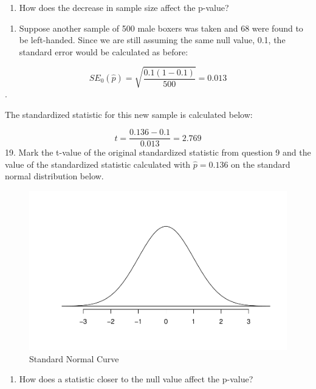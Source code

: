 \documentclass[
]{report}
\providecommand{\tightlist}{%
  \setlength{\itemsep}{0pt}\setlength{\parskip}{0pt}}
\begin{document}
\newpage

\begin{enumerate}
\def\labelenumi{\arabic{enumi}.}
\setcounter{enumi}{16}
\tightlist
\item
  How does the decrease in sample size affect the p-value?
\end{enumerate}

\vspace{0.3in}

\begin{enumerate}
\def\labelenumi{\arabic{enumi}.}
\setcounter{enumi}{17}
\tightlist
\item
  Suppose another sample of 500 male boxers was taken and 68 were found to be left-handed. Since we are still assuming the same null value, 0.1, the standard error would be calculated as before:
\end{enumerate}

\[SE_0(\hat{p})=\sqrt{\frac{0.1(1-0.1)}{500}} = 0.013\].

The standardized statistic for this new sample is calculated below:

\[t = \frac{0.136-0.1}{0.013} = 2.769\]
19. Mark the t-value of the original standardized statistic from question 9 and the value of the standardized statistic calculated with \(\hat{p}=0.136\) on the standard normal distribution below.

\begin{figure}

{\centering \includegraphics[width=0.5\linewidth]{04-A09-inference-1cat-theory_files/figure-latex/Norcuv-1} 

}

\caption{Standard Normal Curve}\label{fig:Norcuv}
\end{figure}

\begin{enumerate}
\def\labelenumi{\arabic{enumi}.}
\setcounter{enumi}{19}
\tightlist
\item
  How does a statistic closer to the null value affect the p-value?
\end{enumerate}
\end{document}

